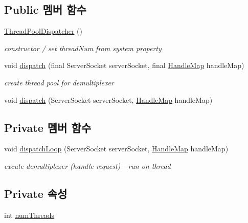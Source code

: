 \subsection*{Public 멤버 함수}
\begin{DoxyCompactItemize}
\item 
\hyperlink{classweek8__server_1_1_thread_pool_dispatcher_afbd2f886e943d35e97a251510d415882}{Thread\-Pool\-Dispatcher} ()
\begin{DoxyCompactList}\small\item\em constructor / set thread\-Num from system property \end{DoxyCompactList}\item 
void \hyperlink{classweek8__server_1_1_thread_pool_dispatcher_a44247cc26ed377303c2e86e00863cf6a}{dispatch} (final Server\-Socket server\-Socket, final \hyperlink{classweek8__server_1_1_handle_map}{Handle\-Map} handle\-Map)
\begin{DoxyCompactList}\small\item\em create thread pool for demultiplexer \end{DoxyCompactList}\item 
void \hyperlink{interfaceweek8__server_1_1_dispatcher_a29b5387e03751725f89de08211e638b7}{dispatch} (Server\-Socket server\-Socket, \hyperlink{classweek8__server_1_1_handle_map}{Handle\-Map} handle\-Map)
\end{DoxyCompactItemize}
\subsection*{Private 멤버 함수}
\begin{DoxyCompactItemize}
\item 
void \hyperlink{classweek8__server_1_1_thread_pool_dispatcher_a7138d250700b8e7c5840ebfe11da0e83}{dispatch\-Loop} (Server\-Socket server\-Socket, \hyperlink{classweek8__server_1_1_handle_map}{Handle\-Map} handle\-Map)
\begin{DoxyCompactList}\small\item\em excute demultiplexer (handle request) -\/ run on thread \end{DoxyCompactList}\end{DoxyCompactItemize}
\subsection*{Private 속성}
\begin{DoxyCompactItemize}
\item 
int \hyperlink{classweek8__server_1_1_thread_pool_dispatcher_af2930528df7e19e996420a857079ea69}{num\-Threads}
\end{DoxyCompactItemize}


